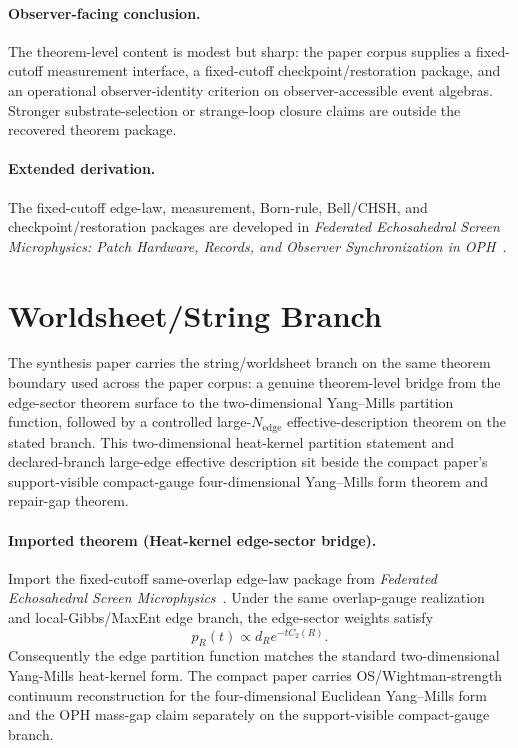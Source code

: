 \paragraph{Observer-facing conclusion.}
The theorem-level content is modest but sharp: the paper corpus supplies a fixed-cutoff measurement interface,
a fixed-cutoff checkpoint/restoration package, and an operational observer-identity criterion on
observer-accessible event algebras. Stronger substrate-selection or strange-loop closure claims
are outside the recovered theorem package.

\paragraph{Extended derivation.}
The fixed-cutoff edge-law, measurement, Born-rule, Bell/CHSH, and checkpoint/restoration packages are developed in
\emph{Federated Echosahedral Screen Microphysics: Patch Hardware, Records, and Observer Synchronization in OPH}~\cite{ophmicrophysics}.

\section{Worldsheet/String Branch}

The synthesis paper carries the string/worldsheet branch on the same theorem boundary used across
the paper corpus: a genuine theorem-level bridge from the edge-sector theorem surface to
the two-dimensional Yang--Mills partition function, followed by a controlled large-\(N_{\mathrm{edge}}\)
effective-description theorem on the stated branch. This two-dimensional heat-kernel partition
statement and declared-branch large-edge effective description sit beside the compact paper's
support-visible compact-gauge four-dimensional Yang--Mills form theorem and repair-gap theorem.

\paragraph{Imported theorem (Heat-kernel edge-sector bridge).}
Import the fixed-cutoff same-overlap edge-law package from
\emph{Federated Echosahedral Screen Microphysics}~\cite{ophmicrophysics}.
Under the same overlap-gauge realization and local-Gibbs/MaxEnt edge branch, the edge-sector
weights satisfy
\[
p_R(t)\propto d_R e^{-t C_2(R)}.
\]
Consequently the edge partition function matches the standard two-dimensional Yang-Mills
heat-kernel form. The compact paper carries OS/Wightman-strength continuum reconstruction for the
four-dimensional Euclidean Yang--Mills form and the OPH mass-gap claim separately on the
support-visible compact-gauge branch.

